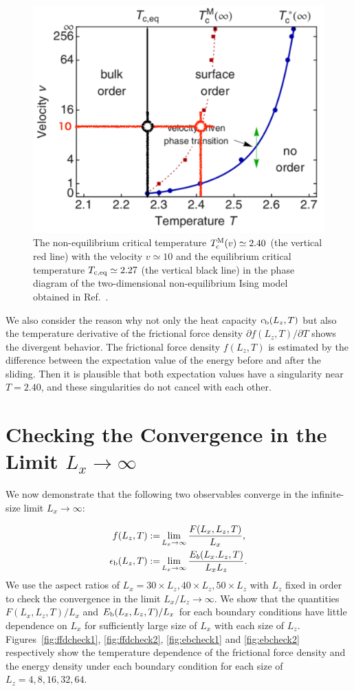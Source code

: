 \begin{figure}[htbp]
	\centering
	\includegraphics[width=0.5\linewidth]{NEPTIsing_.pdf}
	\caption{The non-equilibrium critical temperature $T^{\rm M}_{\rm c}(v)\simeq 2.40$ (the vertical red line) with the velocity $v\simeq 10$ and the equilibrium critical temperature $T_{\rm c, eq}\simeq 2.27$ (the vertical black line) in the phase diagram of the two-dimensional non-equilibrium Ising model obtained in Ref.~\cite{Hucht2009b}\protect\footnotemark.}
	\label{fig:NEPTinIsing_}
\end{figure}


We also consider the reason why not only the heat capacity $c_{\rm b}(L_{z}, T)$ but also the temperature derivative of the frictional force density $\partial f(L_{z}, T)/\partial T$ shows the divergent behavior. The frictional force density $f(L_{z}, T)$ is estimated by the difference between the expectation value of the energy before and after the sliding. Then it is plausible that both expectation values have a singularity near $T=2.40$, and these singularities do not cancel with each other.

\section{Checking the Convergence in the Limit $L_{x}\to\infty$}
\label{sec:convcheck}

We now demonstrate that the following two observables converge in the infinite-size limit $L_{x}\to\infty$:

\begin{align}
f(L_{z}, T):=&\lim_{L_{x}\to\infty}\frac{F(L_{x}, L_{z}, T)}{L_{x}},\\
\epsilon_{\rm b}(L_{z}, T):=&\lim_{L_{x}\to\infty}\frac{E_{b}(L_{x}. L_{z}, T)}{L_{x}L_{z}}.
\end{align}
We use the aspect ratios of $L_{x}=30\times L_{z}, 40\times L_{z}, 50\times L_{z}$ with $L_{z}$ fixed in order to check the convergence in the limit $L_{x}/L_{z}\to\infty$. We show that the quantities $F(L_{x}, L_{z}, T)/L_{x}$ and $E_{\rm b}(L_{x}, L_{z}, T)/L_{x}$ for each boundary conditions have little dependence on $L_{x}$ for sufficiently large size of $L_{x}$ with each size of $L_{z}$. Figures~\ref{fig:ffdcheck1}, \ref{fig:ffdcheck2}, \ref{fig:ebcheck1} and \ref{fig:ebcheck2} respectively show the temperature dependence of the frictional force density and the energy density under each boundary condition for each size of $L_{z} = 4, 8, 16, 32, 64$.

